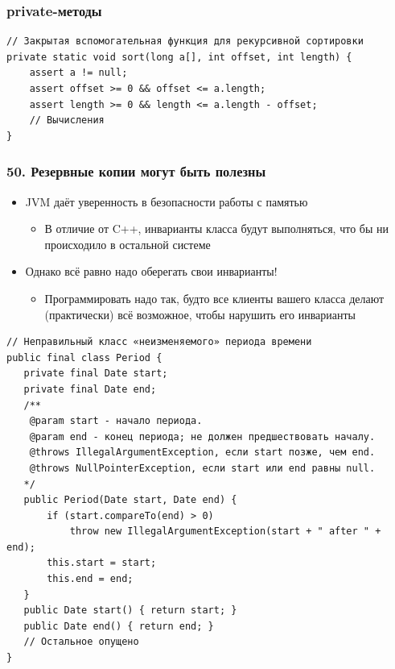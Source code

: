\documentclass[xetex,mathserif,serif]{beamer}
\begin{document}
	\begin{frame}[fragile]
		\frametitle{private-методы}
		\begin{small}
			\begin{verbatim}
// Закрытая вспомогательная функция для рекурсивной сортировки
private static void sort(long a[], int offset, int length) {
    assert a != null;
    assert offset >= 0 && offset <= a.length;
    assert length >= 0 && length <= a.length - offset;
    // Вычисления
}
			\end{verbatim}
		\end{small}
	\end{frame}

	\begin{frame}
		\frametitle{50. Резервные копии могут быть полезны}
		\begin{itemize}
			\item JVM даёт уверенность в безопасности работы с памятью
			\begin{itemize}
				\item В отличие от C++, инварианты класса будут выполняться, что бы ни происходило в остальной системе
			\end{itemize}
			\item Однако всё равно надо оберегать свои инварианты!
			\begin{itemize}
				\item Программировать надо так, будто все клиенты вашего класса делают (практически) всё возможное, чтобы нарушить его инварианты
			\end{itemize}
		\end{itemize}
	\end{frame}

	\begin{frame}[fragile]
		\begin{small}
			\begin{verbatim}
// Неправильный класс «неизменяемого» периода времени
public final class Period {
   private final Date start;
   private final Date end;
   /**
    @param start - начало периода.
    @param end - конец периода; не должен предшествовать началу.
    @throws IllegalArgumentException, если start позже, чем end.
    @throws NullPointerException, если start или end равны null.
   */
   public Period(Date start, Date end) {
       if (start.compareTo(end) > 0)
           throw new IllegalArgumentException(start + " after " + end);
       this.start = start;
       this.end = end;
   }
   public Date start() { return start; }
   public Date end() { return end; }
   // Остальное опущено
}
			\end{verbatim}
		\end{small}
	\end{frame}
\end{document}
